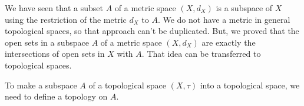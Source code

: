 \label{chap:subspaces}


\vspace*{-17 pt}

\vspace*{13 pt}

\label{sec_sub}

We have seen that a subset $A$ of a metric space $(X,d_X)$ is a subspace of $X$ using the restriction of the metric $d_X$ to $A$. We do not have a metric in general topological spaces, so that approach can't be duplicated. But, we proved that the open sets in a subspace $A$ of a metric space $(X,d_X)$ are exactly the intersections of open sets in $X$ with $A$. That idea can be transferred to topological spaces. 

To make a subspace $A$ of a topological space $(X,\tau)$ into a topological space, we need to define a topology on $A$.

